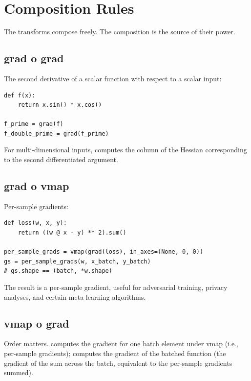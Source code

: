 \section{Composition Rules}
\label{sec:higher_order:composition}

The transforms compose freely. The composition is the source of
their power.

\subsection{grad o grad}
\label{ssec:higher_order:grad_grad}

The second derivative of a scalar function with respect to a
scalar input:

\begin{lstlisting}[style=lucid,language=LucidPython]
def f(x):
    return x.sin() * x.cos()

f_prime = grad(f)
f_double_prime = grad(f_prime)
\end{lstlisting}

For multi-dimensional inputs,  computes the
column of the Hessian corresponding to the second differentiated
argument.

\subsection{grad o vmap}
\label{ssec:higher_order:grad_vmap}

Per-sample gradients:

\begin{lstlisting}[style=lucid,language=LucidPython]
def loss(w, x, y):
    return ((w @ x - y) ** 2).sum()

per_sample_grads = vmap(grad(loss), in_axes=(None, 0, 0))
gs = per_sample_grads(w, x_batch, y_batch)
# gs.shape == (batch, *w.shape)
\end{lstlisting}

The result is a per-sample gradient, useful for adversarial
training, privacy analyses, and certain meta-learning algorithms.

\subsection{vmap o grad}
\label{ssec:higher_order:vmap_grad}

Order matters.  computes the gradient for one
batch element under vmap (i.e., per-sample gradients);
 computes the gradient of the batched
function (the gradient of the sum across the batch, equivalent
to the per-sample gradients summed).

